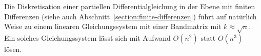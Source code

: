 Die Diskretisation einer partiellen Differentialgleichung in der Ebene
%
%
mit finiten Differenzen
%
(siehe auch Abschnitt~\ref{section:finite-differenzen})
führt auf natürlich Weise zu einem linearen
Gleichungssystem mit einer Bandmatrix mit $k\approx \sqrt{n}$.
Ein solches Gleichungssystem lässt sich mit Aufwand $O(n^2)$ statt 
$O(n^3)$ lösen.








